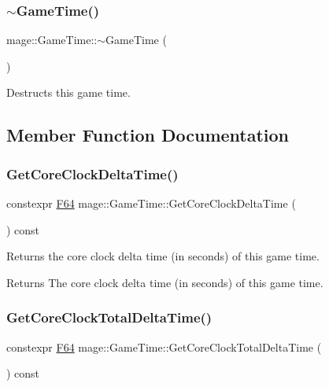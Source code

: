 \subsubsection{\texorpdfstring{$\sim$\+Game\+Time()}{~GameTime()}}
{\footnotesize\ttfamily mage\+::\+Game\+Time\+::$\sim$\+Game\+Time (\begin{DoxyParamCaption}{ }\end{DoxyParamCaption})\hspace{0.3cm}{\ttfamily [default]}}

Destructs this game time. 

\subsection{Member Function Documentation}
\hypertarget{classmage_1_1_game_time_a19333f5e42d9b968e0a172592f7d0bb8}{}\label{classmage_1_1_game_time_a19333f5e42d9b968e0a172592f7d0bb8} 
\subsubsection{\texorpdfstring{Get\+Core\+Clock\+Delta\+Time()}{GetCoreClockDeltaTime()}}
{\footnotesize\ttfamily constexpr \hyperlink{namespacemage_ad26233bbec640deda836e572c1a23708}{F64} mage\+::\+Game\+Time\+::\+Get\+Core\+Clock\+Delta\+Time (\begin{DoxyParamCaption}{ }\end{DoxyParamCaption}) const\hspace{0.3cm}{\ttfamily [noexcept]}}

Returns the core clock delta time (in seconds) of this game time.

\begin{DoxyReturn}{Returns}
The core clock delta time (in seconds) of this game time. 
\end{DoxyReturn}
\hypertarget{classmage_1_1_game_time_a3331e36e04befebb4cebac79d12deb16}{}\label{classmage_1_1_game_time_a3331e36e04befebb4cebac79d12deb16} 
\subsubsection{\texorpdfstring{Get\+Core\+Clock\+Total\+Delta\+Time()}{GetCoreClockTotalDeltaTime()}}
{\footnotesize\ttfamily constexpr \hyperlink{namespacemage_ad26233bbec640deda836e572c1a23708}{F64} mage\+::\+Game\+Time\+::\+Get\+Core\+Clock\+Total\+Delta\+Time (\begin{DoxyParamCaption}{ }\end{DoxyParamCaption}) const\hspace{0.3cm}{\ttfamily [noexcept]}}

